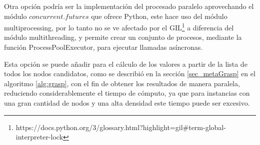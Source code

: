 Otra opción podría ser la implementación del procesado paralelo aprovechando el módulo $concurrent.futures$ que ofrece Python, este hace uso del módulo multiprocessing, por lo tanto no se ve afectado por el \gls{GIL}\footnote{https://docs.python.org/3/glossary.html?highlight=gil\#term-global-interpreter-lock} a diferencia del módulo multithreading, y permite crear un conjunto de procesos, mediante la función ProcessPoolExecutor, para ejecutar llamadas asíncronas. 

Esta opción se puede añadir para el cálculo de los valores a partir de la lista de todos los nodos candidatos, como se describió en la sección \ref{sec_metaGrasp} en el algoritmo \ref{alg:grasp}, con el fin de obtener los resultados de manera paralela, reduciendo considerablemente el tiempo de cómputo, ya que para instancias con una gran cantidad de nodos y una alta densidad este tiempo puede ser excesivo.

